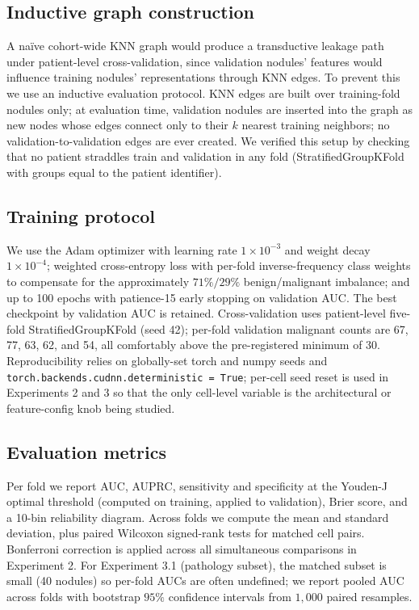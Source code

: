 \documentclass[10pt,letterpaper,twocolumn]{article}
\begin{document}
\subsection{Inductive graph construction}

A na\"ive cohort-wide KNN graph would produce a transductive leakage path under patient-level cross-validation, since validation nodules' features would influence training nodules' representations through KNN edges. To prevent this we use an inductive evaluation protocol. KNN edges are built over training-fold nodules only; at evaluation time, validation nodules are inserted into the graph as new nodes whose edges connect only to their $k$ nearest training neighbors; no validation-to-validation edges are ever created. We verified this setup by checking that no patient straddles train and validation in any fold (StratifiedGroupKFold with groups equal to the patient identifier).

\subsection{Training protocol}

We use the Adam optimizer with learning rate $1{\times}10^{-3}$ and weight decay $1{\times}10^{-4}$; weighted cross-entropy loss with per-fold inverse-frequency class weights to compensate for the approximately $71\%/29\%$ benign/malignant imbalance; and up to 100 epochs with patience-15 early stopping on validation AUC. The best checkpoint by validation AUC is retained. Cross-validation uses patient-level five-fold StratifiedGroupKFold (seed 42); per-fold validation malignant counts are 67, 77, 63, 62, and 54, all comfortably above the pre-registered minimum of 30. Reproducibility relies on globally-set torch and numpy seeds and \texttt{torch.backends.cudnn.deterministic = True}; per-cell seed reset is used in Experiments 2 and 3 so that the only cell-level variable is the architectural or feature-config knob being studied.

\subsection{Evaluation metrics}

Per fold we report AUC, AUPRC, sensitivity and specificity at the Youden-J optimal threshold (computed on training, applied to validation), Brier score, and a 10-bin reliability diagram. Across folds we compute the mean and standard deviation, plus paired Wilcoxon signed-rank tests for matched cell pairs. Bonferroni correction is applied across all simultaneous comparisons in Experiment 2. For Experiment 3.1 (pathology subset), the matched subset is small (40 nodules) so per-fold AUCs are often undefined; we report pooled AUC across folds with bootstrap $95\%$ confidence intervals from $1{,}000$ paired resamples.
\end{document}
